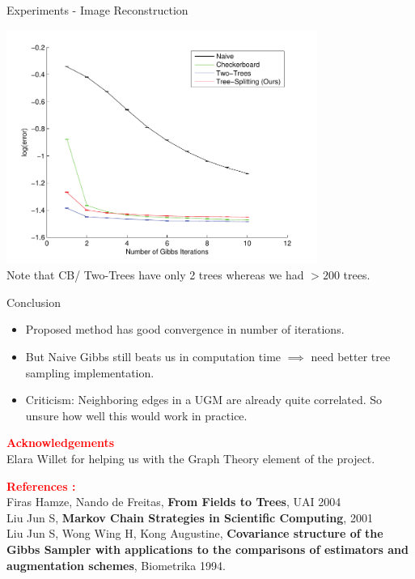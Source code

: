 \documentclass[serif,mathserif,final]{beamer}
\newcommand{\semititle}[1]{\textcolor{red}{\Huge \textbf{#1}}}
\begin{document}
\begin{frame}{}
\begin{columns}[t]
\begin{column}{0.49\linewidth}
\begin{block}{ \Huge Experiments - Image Reconstruction}
{      	\includegraphics[width=4in]{figs/reconstruction} \\
      Note that CB/ Two-Trees have only 2 trees whereas we had $> 200$ trees.

      }
      \end{block}

      \begin{block}{ \Huge Conclusion}
      { \huge

      \begin{itemize}
        \item Proposed method has good convergence in number of iterations.
        \item But Naive Gibbs still beats us in computation time $\implies$ need
better tree sampling implementation.
        \item Criticism: Neighboring edges in a UGM are already quite correlated.
              So unsure how well this would work in practice.
      \end{itemize}

      \semititle{Acknowledgements} \\
      { \Large
      Elara Willet for helping us with the Graph Theory element of the project.
      }

      \semititle{References : } \\
        { \Large
        Firas Hamze, Nando de Freitas, \textbf{From Fields to Trees}, UAI 2004 \\
        Liu Jun S, \textbf{Markov Chain Strategies in Scientific Computing}, 2001 \\
        Liu Jun S, Wong Wing H, Kong Augustine, \textbf{Covariance structure of
          the Gibbs Sampler with applications to the comparisons of estimators and
          augmentation schemes}, Biometrika 1994.
        }
      }
      \end{block}

    \end{column}%


  \end{columns}
\end{frame}
\end{document}
